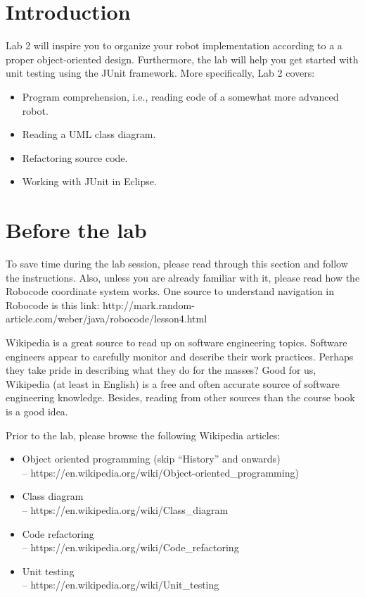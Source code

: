 \documentclass{scrreprt}
\begin{document}
\chapter{Introduction}
Lab 2 will inspire you to organize your robot implementation according to a a proper object-oriented design. Furthermore, the lab will help you get started with unit testing using the JUnit framework. More specifically, Lab 2 covers:

\begin{itemize}
\item Program comprehension, i.e., reading code of a somewhat more advanced robot.
\item Reading a UML class diagram.
\item Refactoring source code.
\item Working with JUnit in Eclipse.
\end{itemize}

\chapter{Before the lab}
To save time during the lab session, please read through this section and follow the instructions. Also, unless you are already familiar with it, please read how the Robocode coordinate system works. One source to understand navigation in Robocode is this link: http://mark.random-article.com/weber/java/robocode/lesson4.html

Wikipedia is a great source to read up on software engineering topics. Software engineers appear to carefully monitor and describe their work practices. Perhaps they take pride in describing what they do for the masses? Good for us, Wikipedia (at least in English) is a free and often accurate source of software engineering knowledge. Besides, reading from other sources than the course book is a good idea.

Prior to the lab, please browse the following Wikipedia articles:
\begin{itemize}
\item Object oriented programming (skip ``History'' and onwards)\\-- https://en.wikipedia.org/wiki/Object-oriented_programming)
\item Class diagram\\-- https://en.wikipedia.org/wiki/Class_diagram
\item Code refactoring\\-- https://en.wikipedia.org/wiki/Code_refactoring
\item Unit testing\\-- https://en.wikipedia.org/wiki/Unit_testing
\end{itemize}
\end{document}
